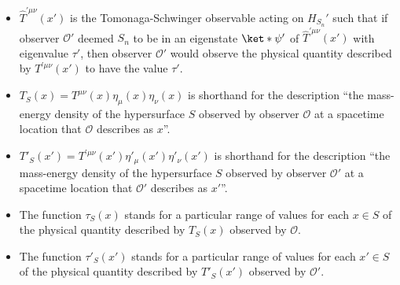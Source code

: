 \documentclass[12pt]{report}
\providecommand{\DIFaddbegin}{} %
\providecommand{\DIFaddend}{} %
\providecommand{\DIFdelbegin}{} %
\providecommand{\DIFdelend}{} %
\begin{document}
\begin{itemize}
\addtocounter{footnote}{-1}%
\DIFdelend \item $\hat{T}^{\prime\mu\nu}(x')$ is the Tomonaga-Schwinger observable acting on $H_{S_n}'$ such that if observer $\mathcal{O}'$ deemed $S_n$ to be in an eigenstate $\ket*{\psi'}$ of  $\hat{T}^{\prime\mu\nu}(x')$ with eigenvalue $\tau'$, then observer $\mathcal{O}'$ would observe the physical quantity described by  $T^{\prime\mu\nu}(x')$ to have the value $\tau'$.  %
\DIFdelbegin %
\DIFdelend \DIFaddbegin {}\DIFaddend %
\item $T_S(x)={T}^{\mu\nu}(x)\eta_{\mu}(x)\eta_{\nu}(x)$ is shorthand for the description ``the mass-energy density of the hypersurface $S$ observed by observer $\mathcal{O}$ at a spacetime location that $\mathcal{O}$ describes as $x$''. 
\item $T'_S(x')={T}^{\prime\mu\nu}(x')\eta'_{\mu}(x')\eta'_{\nu}(x')$ is shorthand for the description ``the mass-energy density of the hypersurface $S$ observed by observer $\mathcal{O}'$ at a spacetime location that $\mathcal{O}'$ describes as $x'$''. %
% 
\item The function $\tau_S(x)$ stands for a particular range of values for each $x\in S$ of the physical quantity described by $T_S(x)$ observed by $\mathcal{O}$. 
\item The function $\tau'_S(x')$ stands for a particular range of values for each $x'\in S$ of the physical quantity described by $T'_S(x')$ observed by $\mathcal{O}'$.  %
%

\end{itemize}
\end{document}
